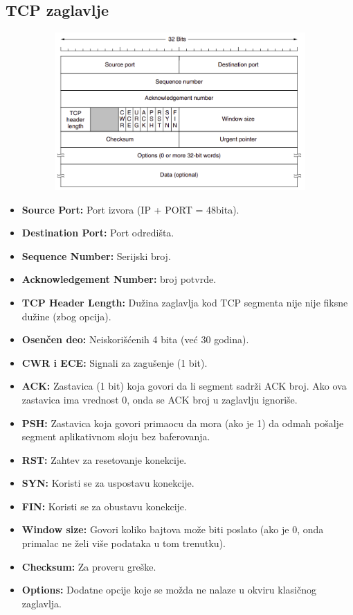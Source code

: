 \documentclass[a4paper]{article}
\begin{document}
    \subsection{TCP zaglavlje}
        \begin{figure}[H]
            \begin{center}
                \includegraphics[width=120mm,height=60mm]{Slike/tcp_zaglavlje.png}
            \end{center}
        \end{figure}
        \begin{itemize}
            \item \textbf{Source Port:} Port izvora (IP + PORT = 48bita).
            \item \textbf{Destination Port:} Port odredišta.
            \item \textbf{Sequence Number:} Serijski broj.
            \item \textbf{Acknowledgement Number:} broj potvrde.
            \item \textbf{TCP Header Length:} Dužina zaglavlja kod TCP segmenta nije
                  nije fiksne dužine (zbog opcija).
            \item \textbf{Osenčen deo:} Neiskorišćenih 4 bita (već 30 godina). 
            \item \textbf{CWR i ECE:} Signali za zagušenje (1 bit).  
            \item \textbf{ACK:} Zastavica (1 bit) koja govori da li segment sadrži
                  ACK broj. Ako ova zastavica ima vrednost 0, onda se ACK broj u
                  zaglavlju ignoriše.
            \item \textbf{PSH:} Zastavica koja govori primaocu da mora (ako je 1) da odmah
                  pošalje segment aplikativnom sloju bez baferovanja.
            \item \textbf{RST:} Zahtev za resetovanje konekcije.
            \item \textbf{SYN:} Koristi se za uspostavu konekcije.
            \item \textbf{FIN:} Koristi se za obustavu konekcije.
            \item \textbf{Window size:} Govori koliko bajtova može biti poslato (ako je 0,
                  onda primalac ne želi više podataka u tom trenutku).
            \item \textbf{Checksum:} Za proveru greške. 
            \item \textbf{Options:} Dodatne opcije koje se možda ne nalaze u okviru klasičnog zaglavlja. 
        \end{itemize}
\end{document}

